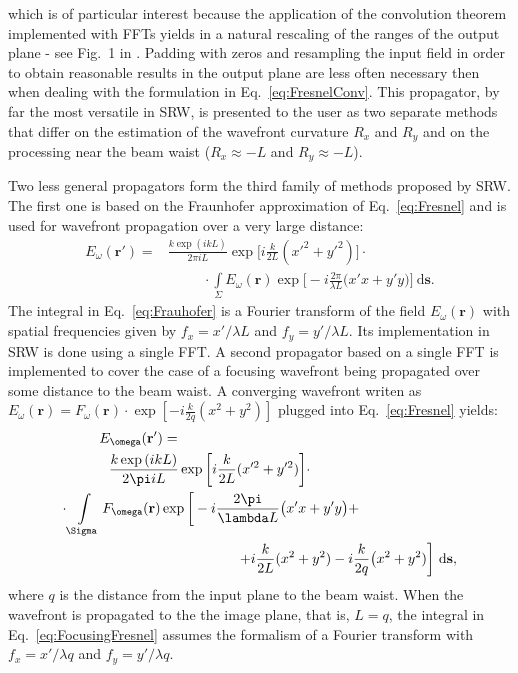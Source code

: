 \documentclass{iucr}              %
\begin{document}
which is of particular interest because the application of the convolution theorem implemented with FFTs yields in a natural rescaling of the ranges of the output plane - see Fig.~1 in \cite{ChubarCelestre}. Padding with zeros and resampling the input field in order to obtain reasonable results in the output plane are less often necessary then when dealing with the formulation in Eq.~\ref{eq:FresnelConv}. This propagator, by far the most versatile in SRW, is presented to the user as two separate methods that differ on the estimation of the wavefront curvature $R_x$ and $R_y$ and on the processing near the beam waist ($R_x\approx-L$ and $R_y\approx-L$). 

Two less general propagators form the third family of methods proposed by SRW. The first one is based on the Fraunhofer approximation of Eq.~\ref{eq:Fresnel} and is used for wavefront propagation over a very large distance:
 \begin{equation}\label{eq:Frauhofer}
\begin{split}
    E_\omega(\textbf{r}') = &\frac{k\exp{(ikL)}}{2\pi i L}\exp{\bigg[i\frac{k}{2L}(x'^2 + y'^2)\bigg]}\cdot \\
    &\enspace\qquad\cdot\int\limits_{\Sigma}{E_\omega(\textbf{r})\exp{\bigg[-i \frac{2\pi}{\lambda L}\big( x'x + y'y \big)\bigg]}~\mathrm{d}\textbf{s}}.
\end{split}
\end{equation}
The integral in Eq.~\ref{eq:Frauhofer} is a Fourier transform of the field $E_\omega(\textbf{r})$ with spatial frequencies given by $f_x=x'\big/\lambda L$ and $f_y=y'\big/\lambda L$. Its implementation in SRW is done using a single FFT. A second propagator based on a single FFT is implemented to cover the case of a focusing wavefront being propagated over some distance to the beam waist. A converging wavefront writen as $E_\omega(\textbf{r}) = F_\omega(\textbf{r})\cdot\exp{[-i\frac{k}{2q}(x^2 + y^2)]}$ plugged into Eq.~\ref{eq:Fresnel} yields:
\begin{equation}\label{eq:FocusingFresnel}
\begin{split}
E_\omega(\textbf{r}') = \qquad\qquad\qquad\qquad\qquad\qquad\qquad\qquad\qquad\qquad &\\
\frac{k\exp{(ikL)}}{2\pi i L}\exp{\bigg[i\frac{k}{2L}(x'^2 + y'^2)\bigg]}\cdot \qquad\qquad\qquad\qquad\qquad\enspace &\\
\cdot\int\limits_{\Sigma}{F_\omega(\textbf{r})\exp{\bigg[-i \frac{2\pi}{\lambda L}\big( x'x + y'y \big) +}} \qquad\qquad\qquad\quad&\\
\hfill+i\frac{k}{2L}(x^2 + y^2) - i \frac{k}{2 q}\big(x^2+y^2) \bigg]~\mathrm{d}\textbf{s},&
\end{split}
\end{equation}
where $q$ is the distance from the input plane to the beam waist. When the wavefront is propagated to the the image plane, that is, $L=q$, the integral in Eq.~\ref{eq:FocusingFresnel} assumes the formalism of a Fourier transform with $f_x=x'\big/\lambda q$ and $f_y=y'\big/\lambda q$. 
\end{document}
